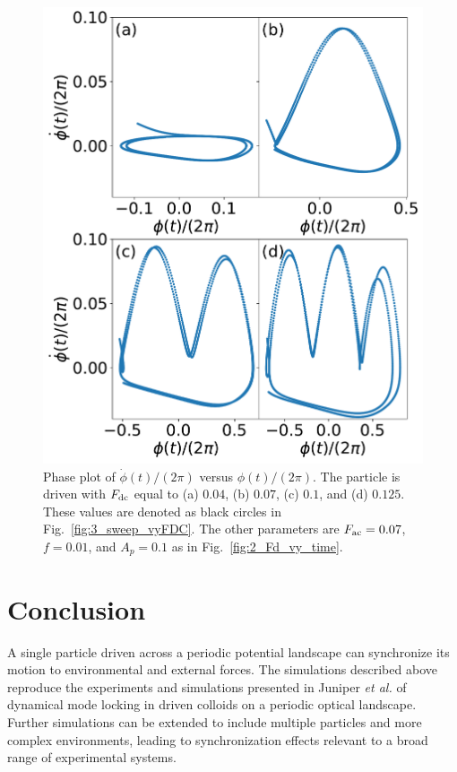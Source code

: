 \documentclass[preprint,showpacs,preprintnumbers,amsmath,amssymb,aps,prb]{revtex4-1}
\theoremstyle{remark}
\begin{document}
    \begin{figure}[h!]
      \centering
      \includegraphics[width=\columnwidth]{fig4_phase.pdf}
      \caption{
        Phase plot of $\dot{\phi}(t)/(2\pi)$ versus $\phi(t)/(2\pi)$.
        The particle is driven with $F_{\rm dc}$ equal to  (a) $0.04$, (b) $0.07$, (c) $0.1$, and (d) $0.125$.  These values are denoted as black circles
        in Fig.~\ref{fig:3_sweep_vyFDC}. 
      The other parameters
      are $F_{\rm ac} = 0.07$, $f=0.01$, and $A_p = 0.1$
      as in Fig.~\ref{fig:2_Fd_vy_time}.}
      \label{fig:4_phase}
    \end{figure}

\section{Conclusion}
\label{sec:conclusion}	

A single particle driven across a periodic potential landscape 
can synchronize its motion 
to environmental and external forces. 
The simulations described above
reproduce the experiments and simulations presented in 
Juniper {\it et al.} \cite{Juniper2015, Juniper2017}
of dynamical 
mode locking in
driven colloids on a
periodic optical landscape.
Further simulations can be extended
to include multiple particles
and more complex environments,
leading to
synchronization effects relevant 
to a broad range of experimental systems.
\end{document}
